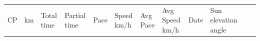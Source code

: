 \documentclass[]{elsarticle} %
\begin{document}
{\def\LTcaptype{none} %
\begin{longtable}[]{@{}
  >{\centering\arraybackslash}p{}
  >{\centering\arraybackslash}p{}
  >{\centering\arraybackslash}p{}
  >{\centering\arraybackslash}p{}
  >{\centering\arraybackslash}p{}
  >{\centering\arraybackslash}p{}
  >{\centering\arraybackslash}p{}
  >{\centering\arraybackslash}p{}
  >{\centering\arraybackslash}p{}
  >{\centering\arraybackslash}p{}
  >{\centering\arraybackslash}p{}
  >{\centering\arraybackslash}p{}@{}}
\toprule\noalign{}
\begin{minipage}[b]{\linewidth}\centering
CP
\end{minipage} & \begin{minipage}[b]{\linewidth}\centering
km
\end{minipage} & \begin{minipage}[b]{\linewidth}\centering
Total time
\end{minipage} & \begin{minipage}[b]{\linewidth}\centering
Partial time
\end{minipage} & \begin{minipage}[b]{\linewidth}\centering
Pace
\end{minipage} & \begin{minipage}[b]{\linewidth}\centering
Speed km/h
\end{minipage} & \begin{minipage}[b]{\linewidth}\centering
Avg Pace
\end{minipage} & \begin{minipage}[b]{\linewidth}\centering
Avg Speed km/h
\end{minipage} & \begin{minipage}[b]{\linewidth}\centering
Date
\end{minipage} & \begin{minipage}[b]{\linewidth}\centering
Sun elevation angle
\end{minipage} & \begin{minipage}[b]{\linewidth}\centering

\end{minipage}
\end{longtable}}
\end{document}

